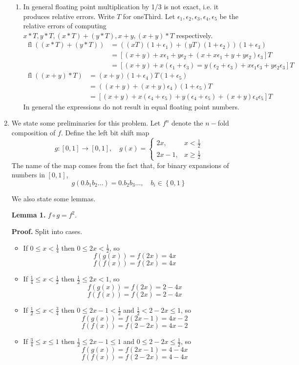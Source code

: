 \documentclass{article}
\def\tbf#1{\textbf{#1}}
\newcommand{\sbr}[1]{\left[#1\right]}
\newcommand{\brc}[1]{\left\{#1\right\}}
\newcommand{\e}{\epsilon}
\newcommand{\pf}{\tbf{Proof. }}
\DeclareMathOperator{\fl}{fl}
\begin{document}
\begin{enumerate}
\begin{enumerate}
		\item In general floating point multiplication by 1/3 is not exact, i.e. it produces relative errors. Write $T$ for oneThird. Let $\e_1,\e_2,\e_3,\e_4,\e_5$ be the relative errors of computing $x*T,y*T,(x*T)+(y*T),x+y,(x+y)*T$ respectively.
		\begin{align*}
			\fl((x*T)+(y*T)) &= ((xT)(1+\e_1)+(yT)(1+\e_2))(1+\e_3) \\
			&= \sbr{(x+y) + x\e_1 + y\e_2 + (x+x\e_1+y+y\e_2)\e_3}T \\
			&= \sbr{(x+y) + x(\e_1+\e_3) = y(\e_2+\e_3) + x\e_1\e_3 + y\e_2\e_3}T
		\end{align*}
		\begin{align*}
			\fl((x+y)*T) &= (x+y)(1+\e_4)T(1+\e_5) \\
			&= ((x+y)+(x+y)\e_4)(1+\e_5)T \\
			&= \sbr{(x+y) + x(\e_4+\e_5) + y(\e_4+\e_5) + (x+y)\e_4\e_5}T
		\end{align*}
		In general the expressions do not result in equal floating point numbers.
		
		
	\end{enumerate}
	
	
	
	\item We state some preliminaries for this problem. Let $f^n$ denote the $n-$fold composition of $f$. Define the left bit shift map
	\[g:[0,1]\to[0,1],
	\quad g(x) =
	\begin{cases}
		2x, & x<\frac12 \\
		2x-1, & x\ge\frac12
	\end{cases}\]
	The name of the map comes from the fact that, for binary expansions of numbers in $[0,1]$,
	\[g(0.b_1b_2\dots) = 0.b_2b_3\dots,
	\quad b_i\in\brc{0,1}\]
	
	
	We also state some lemmas.
	
	
	\tbf{Lemma 1.} $f\circ g=f^2$.
	
	\pf Split into cases.
	\begin{itemize}
		\item If $0\le x<\frac14$ then $0\le 2x<\frac12$, so
		\[f(g(x)) = f(2x) = 4x\]
		\[f(f(x)) = f(2x) = 4x\]
		\item If $\frac14\le x<\frac12$ then $\frac12\le 2x<1$, so
		\[f(g(x)) = f(2x) = 2-4x\]
		\[f(f(x)) = f(2x) = 2-4x\]
		\item If $\frac12\le x<\frac34$ then $0\le 2x-1<\frac12$ and $\frac12<2-2x\le1$, so
		\[f(g(x)) = f(2x-1) = 4x-2\]
		\[f(f(x)) = f(2-2x) = 4x-2\]
		\item If $\frac34\le x\le 1$ then $\frac12\le 2x-1\le 1$ and $0\le 2-2x\le\frac12$, so
		\[f(g(x)) = f(2x-1) = 4-4x\]
		\[f(f(x)) = f(2-2x) = 4-4x\]
	\end{itemize}
	

\end{enumerate}
\end{document}
